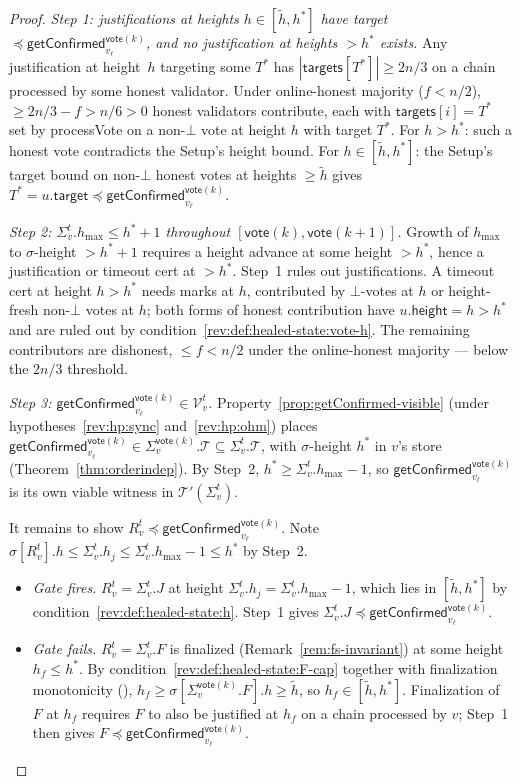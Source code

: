 \ifx\litemode\undefined\documentclass{article}\fi
\newcommand{\T}[0]{\ensuremath{\mathcal{T}}}
\newcommand{\V}[0]{\ensuremath{\mathcal{V}}}
\newcommand{\target}{\mathsf{target}}
\newcommand{\height}{\mathsf{height}}
\newcommand{\targets}{\mathsf{targets}}
\newcommand{\hmax}{\ensuremath{h_{\max}}\xspace}
\newcommand{\processVote}{\textsf{processVote}\xspace}
\newcommand{\vote}{\ensuremath{\mathsf{vote}}}
\newcommand{\comm}[1]{\ensuremath{\widetilde{#1}}}
\newcommand{\getConfirmed}{\textsf{getConfirmed}\xspace}
\theoremstyle{plain}
\theoremstyle{definition}
\theoremstyle{remark}
\begin{document}
\begin{proof}
\medskip

\emph{Step 1: justifications at heights $h \in [\comm{h}, h^\ast]$ have target $\preceq \getConfirmed_{v_\ell}^{\vote(k)}$, and no justification at heights $> h^\ast$ exists.}
Any justification at height~$h$ targeting some $T^\ast$ has $|\targets[T^\ast]| \geq 2n/3$ on a chain processed by some honest validator.
Under online-honest majority ($f < n/2$), $\geq 2n/3 - f > n/6 > 0$ honest validators contribute, each with $\targets[i] = T^\ast$ set by \processVote{} on a non-$\bot$ vote at height $h$ with target $T^\ast$.
For $h > h^\ast$: such a honest vote contradicts the Setup's height bound.
For $h \in [\comm{h}, h^\ast]$: the Setup's target bound on non-$\bot$ honest votes at heights $\geq \comm{h}$ gives $T^\ast = u.\target \preceq \getConfirmed_{v_\ell}^{\vote(k)}$.

\emph{Step 2: $\Sigma_v^t.\hmax \leq h^\ast + 1$ throughout $[\vote(k), \vote(k{+}1)]$.}
Growth of $\hmax$ to $\sigma$-height $> h^\ast + 1$ requires a height advance at some height $> h^\ast$, hence a justification or timeout cert at $> h^\ast$.
Step~1 rules out justifications.
A timeout cert at height $h > h^\ast$ needs marks at $h$, contributed by $\bot$-votes at $h$ or height-fresh non-$\bot$ votes at $h$;
both forms of honest contribution have $u.\height = h > h^\ast$ and are ruled out by condition~\ref{rev:def:healed-state:vote-h}.
The remaining contributors are dishonest, $\leq f < n/2$ under the online-honest majority --- below the $2n/3$ threshold.

\emph{Step 3: $\getConfirmed_{v_\ell}^{\vote(k)} \in \V_v^t$.}
Property~\ref{prop:getConfirmed-visible} (under hypotheses~\ref{rev:hp:sync} and~\ref{rev:hp:ohm}) places $\getConfirmed_{v_\ell}^{\vote(k)} \in \Sigma_v^{\vote(k)}.\T \subseteq \Sigma_v^t.\T$, with $\sigma$-height $h^\ast$ in $v$'s store (Theorem~\ref{thm:orderindep}).
By Step~2, $h^\ast \geq \Sigma_v^t.\hmax - 1$, so $\getConfirmed_{v_\ell}^{\vote(k)}$ is its own viable witness in $\T'(\Sigma_v^t)$.

It remains to show $R_v^t \preceq \getConfirmed_{v_\ell}^{\vote(k)}$.
Note $\sigma[R_v^t].h \leq \Sigma_v^t.h_j \leq \Sigma_v^t.\hmax - 1 \leq h^\ast$ by Step~2.
\begin{itemize}
  \item \emph{Gate fires.} $R_v^t = \Sigma_v^t.J$ at height $\Sigma_v^t.h_j = \Sigma_v^t.\hmax - 1$, which lies in $[\comm{h}, h^\ast]$ by condition~\ref{rev:def:healed-state:h}.
  Step~1 gives $\Sigma_v^t.J \preceq \getConfirmed_{v_\ell}^{\vote(k)}$.
  \item \emph{Gate fails.} $R_v^t = \Sigma_v^t.F$ is finalized (Remark~\ref{rem:fs-invariant}) at some height $h_f \leq h^\ast$.
  By condition~\ref{rev:def:healed-state:F-cap} together with finalization monotonicity (), $h_f \geq \sigma[\Sigma_v^{\vote(k)}.F].h \geq \comm{h}$, so $h_f \in [\comm{h}, h^\ast]$.
  Finalization of $F$ at $h_f$ requires $F$ to also be justified at $h_f$ on a chain processed by $v$;
  Step~1 then gives $F \preceq \getConfirmed_{v_\ell}^{\vote(k)}$.
\end{itemize}


\end{proof}
\end{document}
